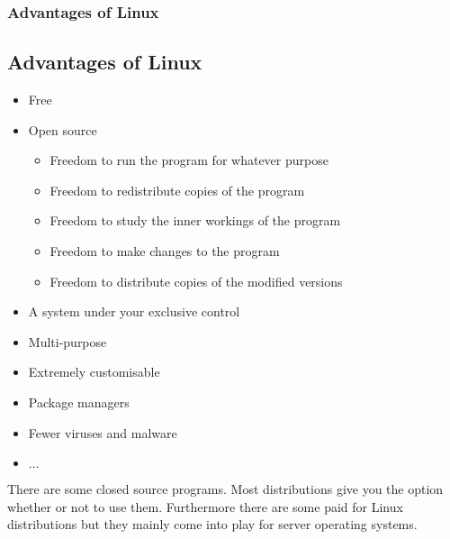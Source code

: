 \begin{frame}
	\frametitle{Advantages of Linux}
	\subsection{Advantages of Linux}
	
	\begin{itemize}
		\item Free
		\item Open source
			\begin{tiny}
				\begin{itemize}
					\item Freedom to run the program for whatever purpose
					\item Freedom to redistribute copies of the program
					\item Freedom to study the inner workings of the program
					\item Freedom to make changes to the program
					\item Freedom to distribute copies of the modified versions
				\end{itemize}
			\end{tiny}
		\item A system under your exclusive control
		\item Multi-purpose
		\item Extremely customisable
		\item Package managers
		\item Fewer viruses and malware
		\item $\dots$
	\end{itemize}

	\vfill
	
	There are some closed source programs. Most distributions give you the option whether or not to use them. Furthermore there are some paid for Linux distributions but they mainly come into play for server operating systems.
\end{frame}
